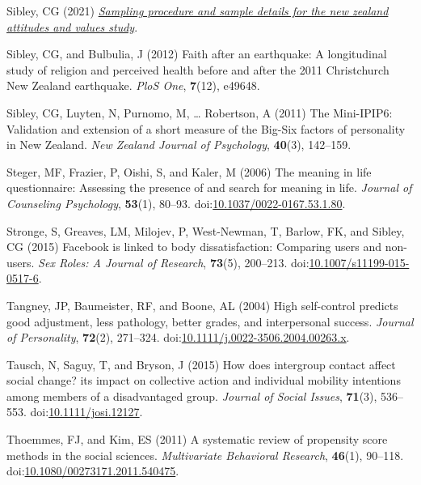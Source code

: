\documentclass[
  singlecolumn,
  9pt]{article}
\newlength{\cslhangindent}
\newenvironment{CSLReferences}[2] %
 {\begin{list}{}{%
  \setlength{\itemindent}{0pt}
  \setlength{\leftmargin}{0pt}
  \setlength{\parsep}{0pt}
  \ifodd #1
   \setlength{\leftmargin}{\cslhangindent}
   \setlength{\itemindent}{-1\cslhangindent}
  \fi
  \setlength{\itemsep}{#2\baselineskip}}}
 {\end{list}}
\begin{document}
\begin{CSLReferences}{1}{0}
Sibley, CG (2021)
\emph{\href{https://doi.org/10.31234/osf.io/wgqvy}{Sampling procedure
and sample details for the new zealand attitudes and values study}}.

Sibley, CG, and Bulbulia, J (2012) Faith after an earthquake: A
longitudinal study of religion and perceived health before and after the
2011 {C}hristchurch {N}ew {Z}ealand earthquake. \emph{PloS One},
\textbf{7}(12), e49648.

Sibley, CG, Luyten, N, Purnomo, M, \ldots{} Robertson, A (2011) The
Mini-IPIP6: Validation and extension of a short measure of the Big-Six
factors of personality in New Zealand. \emph{New Zealand Journal of
Psychology}, \textbf{40}(3), 142--159.

Steger, MF, Frazier, P, Oishi, S, and Kaler, M (2006) The meaning in
life questionnaire: Assessing the presence of and search for meaning in
life. \emph{Journal of Counseling Psychology}, \textbf{53}(1), 80--93.
doi:\href{https://doi.org/10.1037/0022-0167.53.1.80}{10.1037/0022-0167.53.1.80}.

Stronge, S, Greaves, LM, Milojev, P, West-Newman, T, Barlow, FK, and
Sibley, CG (2015) Facebook is linked to body dissatisfaction: Comparing
users and non-users. \emph{Sex Roles: A Journal of Research},
\textbf{73}(5), 200--213.
doi:\href{https://doi.org/10.1007/s11199-015-0517-6}{10.1007/s11199-015-0517-6}.

Tangney, JP, Baumeister, RF, and Boone, AL (2004) High self-control
predicts good adjustment, less pathology, better grades, and
interpersonal success. \emph{Journal of Personality}, \textbf{72}(2),
271--324.
doi:\href{https://doi.org/10.1111/j.0022-3506.2004.00263.x}{10.1111/j.0022-3506.2004.00263.x}.

Tausch, N, Saguy, T, and Bryson, J (2015) How does intergroup contact
affect social change? its impact on collective action and individual
mobility intentions among members of a disadvantaged group.
\emph{Journal of Social Issues}, \textbf{71}(3), 536--553.
doi:\href{https://doi.org/10.1111/josi.12127}{10.1111/josi.12127}.

Thoemmes, FJ, and Kim, ES (2011) A systematic review of propensity score
methods in the social sciences. \emph{Multivariate Behavioral Research},
\textbf{46}(1), 90--118.
doi:\href{https://doi.org/10.1080/00273171.2011.540475}{10.1080/00273171.2011.540475}.


\end{CSLReferences}
\end{document}
